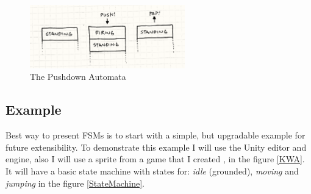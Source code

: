\documentclass[a4paper, 12pt]{book}
\begin{document}
\begin{figure}[h]
\begin{center}
\includegraphics[width=0.6\textwidth]{Images/state_pushdown.png}
\end{center}
\caption{The Pushdown Automata}
\label{pic2}
\end{figure}

\subsection{Example}

Best way to present FSMs is to start with a simple, but upgradable example for future extensibility. To demonstrate this example I will use the Unity \cite{UnitySoftware} editor and engine, also I will use a sprite from a game that I created \cite{KWA}, in the figure \ref{KWA}. It will have a basic state machine with states for: \emph{idle} (grounded), \emph{moving} and \emph{jumping} in the figure \ref{StateMachine}.
\end{document}
